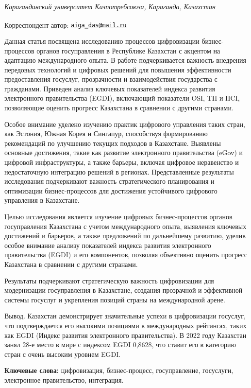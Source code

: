 {\emph{Карагандинский университет Казпотребсоюза, Караганда, Казахстан}

{\bfseries \textsuperscript{\envelope }}Корреспондент-автор:
\href{mailto:aiga_das@mail.ru}{\nolinkurl{aiga\_das@mail.ru}}

Данная статья посвящена исследованию процессов цифровизации
бизнес-процессов органов госуправления в Республике Казахстан с акцентом
на адаптацию международного опыта. В работе подчеркивается важность
внедрения передовых технологий и цифровых решений для повышения
эффективности предоставления госуслуг, прозрачности и взаимодействия
государства с гражданами. Приведен анализ ключевых показателей индекса
развития электронного правительства (EGDI), включающий показатели OSI,
TII и HCI, позволяющие оценить прогресс Казахстана в сравнении с другими
странами.

Особое внимание уделено изучению практик цифрового управления таких
стран, как Эстония, Южная Корея и Сингапур, способствуя формированию
рекомендаций по улучшению текущих подходов в Казахстане. Выявлены
основные достижения, такие как развитие электронного правительства
(eGov) и цифровой инфраструктуры, а также барьеры, включая цифровое
неравенство и недостаточную интеграцию решений в регионах.
Представленные результаты исследования подчеркивают важность
стратегического планирования и оптимизации бизнес-процессов для
достижения устойчивого цифрового управления в Казахстане.

Целью исследования является изучение цифровых бизнес-процессов органов
госуправления Казахстана с учетом международного опыта, выявления
ключевых достижений и барьеров, а также предложений по дальнейшему
развитию, уделив особое внимание анализу показателей индекса развития
электронного правительства (EGDI) и его компонентов, позволяя объективно
оценить прогресс Казахстана в сравнении с другими странами.

Результаты подчеркивают стратегическую важность цифровизации для
модернизации госуправления в Казахстане, создания прозрачной и
эффективной системы госуслуг и укрепления позиций страны на
международной арене.

Вывод. Казахстан демонстрирует значительные успехи в цифровизации
госуслуг, что подтверждается его высокими позициями в международных
рейтингах, таких как EGDI (Индекс развития электронного правительства).
В 2022 году Казахстан занял 28-е место в мире с индексом EGDI 0,8628,
что ставит его в категорию стран с очень высоким уровнем EGDI.

{\bfseries Ключевые слова:} цифровизация, бизнес-процесс, госуправление,
госуслуги, электронное правительство, интеграция.

}
